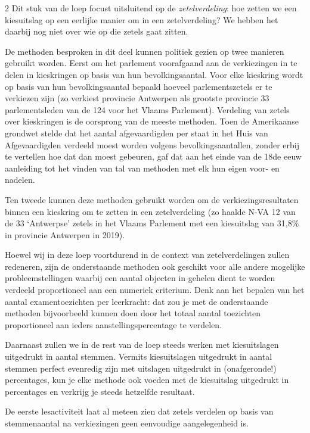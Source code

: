 \begin{multicols}{2}
Dit stuk van de loep focust uitsluitend op de \emph{zetelverdeling}: hoe zetten we een kiesuitslag op een eerlijke manier om in een zetelverdeling? We hebben het daarbij nog niet over wie op die zetels gaat zitten. 

De methoden besproken in dit deel kunnen politiek gezien op twee manieren gebruikt worden. Eerst om het parlement voorafgaand aan de verkiezingen in te delen in kieskringen op basis van hun bevolkingsaantal. Voor elke kieskring wordt op basis van hun bevolkingsaantal bepaald hoeveel parlementszetels er te verkiezen zijn (zo verkiest provincie Antwerpen als grootste provincie 33 parlementsleden van de 124 voor het Vlaams Parlement). Verdeling van zetels over kieskringen is de oorsprong van de meeste methoden. Toen de Amerikaanse grondwet stelde dat het aantal afgevaardigden per staat in het Huis van Afgevaardigden verdeeld moest worden volgens bevolkingsaantallen, zonder erbij te vertellen hoe dat dan moest gebeuren, gaf dat aan het einde van de 18de eeuw aanleiding tot het vinden van tal van methoden met elk hun eigen voor- en nadelen. 

Ten tweede kunnen deze methoden gebruikt worden om de verkiezingsresultaten binnen een kieskring om te zetten in een zetelverdeling (zo haalde N-VA 12 van de 33 `Antwerpse' zetels in het Vlaams Parlement met een kiesuitslag van 31,8\% in provincie Antwerpen in 2019).  

Hoewel wij in deze loep voortdurend in de context van zetelverdelingen zullen redeneren, zijn de onderstaande methoden ook geschikt voor alle andere mogelijke probleemstellingen waarbij een aantal objecten in gehelen dient te worden verdeeld proportioneel aan een numeriek criterium. Denk aan het bepalen van het aantal examentoezichten per leerkracht: dat zou je met de onderstaande methoden bijvoorbeeld kunnen doen door het totaal aantal toezichten proportioneel aan ieders aanstellingspercentage te verdelen. 

Daarnaast zullen we in de rest van de loep steeds werken met kiesuitslagen uitgedrukt in aantal stemmen. Vermits kiesuitslagen uitgedrukt in  aantal stemmen perfect evenredig zijn met uitslagen uitgedrukt in (onafgeronde!) percentages, kun je elke methode ook voeden met de kiesuitslag uitgedrukt in percentages en verkrijg je steeds hetzelfde resultaat.

De eerste lesactiviteit laat al meteen zien dat zetels verdelen op basis van stemmenaantal na verkiezingen geen eenvoudige aangelegenheid is.
\end{multicols}
